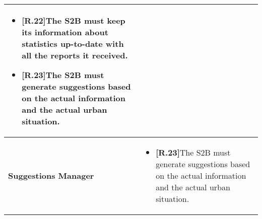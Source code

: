 \begin{table}[H]
\begin{tabular}{|l|p{}|}
\begin{itemize}
    \item \textbf{[R.22]}The S2B must keep its information about statistics up-to-date with all the reports it received.
    
    \item \textbf{[R.23]}The S2B must generate suggestions based on the actual information and the actual urban situation.
    
\end{itemize} \\\hline


\textbf{Suggestions Manager}    &  \begin{itemize}
    \item \textbf{[R.23]}The S2B must generate suggestions based on the actual information and the actual urban situation.
\end{itemize} \\\hline




\end{tabular}
\end{table}

